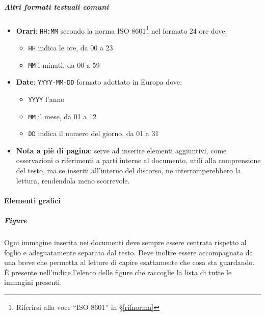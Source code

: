 			\subparagraph{Altri formati testuali comuni} \label{PS:Documentazione:Design:NormeT:AltriFormati}
			\begin{itemize}
				\item \textbf{Orari}: \texttt{HH:MM} secondo la norma ISO 8601\footnote{Riferirsi alla voce ``ISO 8601'' in \S\ref{rifnorma}}
				nel formato 24 ore dove:
				\begin{itemize}
					\item \texttt{HH} indica le ore, da 00 a 23
					\item \texttt{MM} i minuti, da 00 a 59
				\end{itemize}
				\item \textbf{Date}: \texttt{YYYY-MM-DD} formato adottato in Europa dove:
				\begin{itemize}
					\item \texttt{YYYY} l'anno
					\item \texttt{MM} il mese, da 01 a 12
					\item \texttt{DD} indica il numero del giorno, da 01 a 31
				\end{itemize}
				\item \textbf{Nota a piè di pagina}: serve ad inserire elementi aggiuntivi, come osservazioni o riferimenti a parti interne al documento, utili alla comprensione del testo,
				ma se inseriti all'interno del discorso, ne interromperebbero la lettura, rendendola meno scorrevole.
			\end{itemize}


			\paragraph{Elementi grafici}

			\subparagraph{Figure}
			Ogni immagine inserita nei documenti deve sempre essere centrata rispetto al foglio e adeguatamente separata dal testo. Deve inoltre essere
			accompagnata da una breve  che permetta al lettore di capire esattamente che cosa sta guardando.\\
			È presente nell'indice l'elenco delle figure che raccoglie la lista di tutte le immagini presenti.

